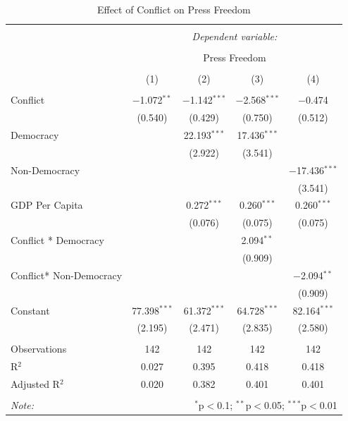 \documentclass[12pt]{article}
\begin{document}
\begin{enumerate}
\begin{table}[!htbp] \centering 
  \caption{Effect of Conflict on Press Freedom} 
  \label{} 
\begin{tabular}{@{\extracolsep{5pt}}lcccc} 
\\[-1.8ex]\hline 
\hline \\[-1.8ex] 
 & \multicolumn{4}{c}{\textit{Dependent variable:}} \\ 
\cline{2-5} 
\\[-1.8ex] & \multicolumn{4}{c}{Press Freedom} \\ 
\\[-1.8ex] & (1) & (2) & (3) & (4)\\ 
\hline \\[-1.8ex] 
 Conflict & $-$1.072$^{**}$ & $-$1.142$^{***}$ & $-$2.568$^{***}$ & $-$0.474 \\ 
  & (0.540) & (0.429) & (0.750) & (0.512) \\ 
  Democracy &  & 22.193$^{***}$ & 17.436$^{***}$ &  \\ 
  &  & (2.922) & (3.541) &  \\ 
  Non-Democracy &  &  &  & $-$17.436$^{***}$ \\ 
  &  &  &  & (3.541) \\ 
  GDP Per Capita &  & 0.272$^{***}$ & 0.260$^{***}$ & 0.260$^{***}$ \\ 
  &  & (0.076) & (0.075) & (0.075) \\ 
  Conflict * Democracy &  &  & 2.094$^{**}$ &  \\ 
  &  &  & (0.909) &  \\ 
  Conflict* Non-Democracy &  &  &  & $-$2.094$^{**}$ \\ 
  &  &  &  & (0.909) \\ 
  Constant & 77.398$^{***}$ & 61.372$^{***}$ & 64.728$^{***}$ & 82.164$^{***}$ \\ 
  & (2.195) & (2.471) & (2.835) & (2.580) \\ 
 \hline \\[-1.8ex] 
Observations & 142 & 142 & 142 & 142 \\ 
R$^{2}$ & 0.027 & 0.395 & 0.418 & 0.418 \\ 
Adjusted R$^{2}$ & 0.020 & 0.382 & 0.401 & 0.401 \\ 
\hline 
\hline \\[-1.8ex] 
\textit{Note:}  & \multicolumn{4}{r}{$^{*}$p$<$0.1; $^{**}$p$<$0.05; $^{***}$p$<$0.01} \\ 

\end{tabular}
\end{table}
\end{enumerate}
\end{document}
